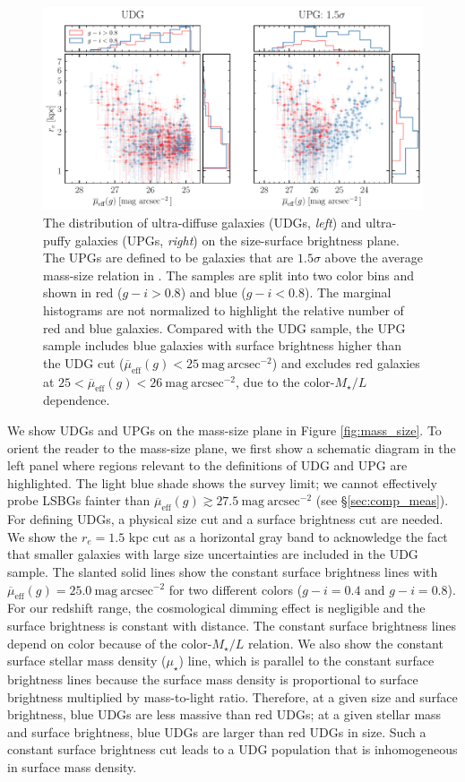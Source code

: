 \documentclass[twocolumn,astrosymb,twocolappendix]{aastex631}
\newcommand{\sbunit}{\mathrm{mag\ arcsec}^{-2}}
\newcommand{\sbeff}{\overline{\mu}_{\mathrm{eff}}(g)}
\begin{document}
\begin{CJK*}{UTF8}{gbsn}
\begin{figure}
	\vbox{ 
		\centering
		\includegraphics[width=1\linewidth]{udg_upg_sample.pdf}
	}
    \caption{The distribution of ultra-diffuse galaxies (UDGs, \textit{left}) and ultra-puffy galaxies (UPGs, \textit{right}) on the size-surface brightness plane. The UPGs are defined to be galaxies that are $1.5\sigma$ above the average mass-size relation in \citet{ELVES-I}. The samples are split into two color bins and shown in red ($g-i>0.8$) and blue ($g-i<0.8$). The marginal histograms are not normalized to highlight the relative number of red and blue galaxies. Compared with the UDG sample, the UPG sample includes blue galaxies with surface brightness higher than the UDG cut ($\sbeff < 25\ \sbunit$) and excludes red galaxies at $25 < \sbeff < 26\ \sbunit$, due to the color-$M_\star/L$ dependence.
    }
    \label{fig:udg_upg_re_mu}
\end{figure}


We show UDGs and UPGs on the mass-size plane in Figure \ref{fig:mass_size}. To orient the reader to the mass-size plane, we first show a schematic diagram in the left panel where regions relevant to the definitions of UDG and UPG are highlighted. The light blue shade shows the survey limit; we cannot effectively probe LSBGs fainter than $\sbeff \gtrsim 27.5\ \sbunit$ (see \S\ref{sec:comp_meas}). 
For defining UDGs, a physical size cut and a surface brightness cut are needed. We show the $r_e = 1.5$ kpc cut as a horizontal gray band to acknowledge the fact that smaller galaxies with large size uncertainties are included in the UDG sample. The slanted solid lines show the constant surface brightness lines with $\sbeff = 25.0\ \sbunit$ for two different colors ($g-i=0.4$ and $g-i=0.8$). For our redshift range, the cosmological dimming effect is negligible and the surface brightness is constant with distance. The constant surface brightness lines depend on color because of the color-$M_\star/L$ relation. We also show the constant surface stellar mass density ($\mu_\star$) line, which is parallel to the constant surface brightness lines because the surface mass density is proportional to surface brightness multiplied by mass-to-light ratio. Therefore, at a given size and surface brightness, blue UDGs are less massive than red UDGs; at a given stellar mass and  surface brightness, blue UDGs are larger than red UDGs in size. Such a constant surface brightness cut leads to a UDG population that is inhomogeneous in surface mass density. 


\end{CJK*}
\end{document}
